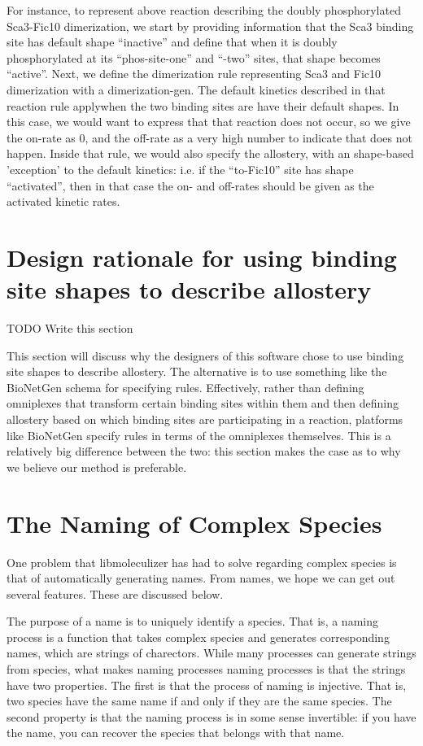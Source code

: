 For instance, to represent above reaction describing the doubly
phosphorylated Sca3-Fic10 dimerization, we start by providing
information that the Sca3 binding site has default shape ``inactive''
and define that when it is doubly phosphorylated at its
``phos-site-one'' and ``-two'' sites, that shape becomes ``active''.
Next, we define the dimerization rule representing Sca3 and Fic10
dimerization with a dimerization-gen.  The default kinetics described
in that reaction rule applywhen the two binding sites are have their
default shapes.  In this case, we would want to express that that
reaction does not occur, so we give the on-rate as 0, and the off-rate
as a very high number to indicate that does not happen.  Inside that
rule, we would also specify the allostery, with an shape-based
'exception' to the default kinetics: i.e. if the ``to-Fic10'' site has
shape ``activated'', then in that case the on- and off-rates should be
given as the activated kinetic rates.  

\section{Design rationale for using binding site shapes to describe allostery}
TODO Write this section

This section will discuss why the designers of this software chose to
use binding site shapes to describe allostery.  The alternative is to
use something like the BioNetGen schema for specifying rules.
Effectively, rather than defining omniplexes that transform certain
binding sites within them and then defining allostery based on which
binding sites are participating in a reaction, platforms like
BioNetGen specify rules in terms of the omniplexes themselves.  This
is a relatively big difference between the two: this section makes the
case as to why we believe our method is preferable.  

\section{The Naming of Complex Species}
One problem that libmoleculizer has had to solve regarding complex
species is that of automatically generating names.  From names, we
hope we can get out several features.  These are discussed below.  

The purpose of a name is to uniquely identify a species.  That is, a
naming process is a function that takes complex species and generates
corresponding names, which are strings of charectors.  While many
processes can generate strings from species, what makes naming
processes naming processes is that the strings have two properties.
The first is that the process of naming is injective.  That is, two
species have the same name if and only if they are the same species.  
The second property is that the naming process is in some sense
invertible: if you have the name, you can recover the species that
belongs with that name.  

